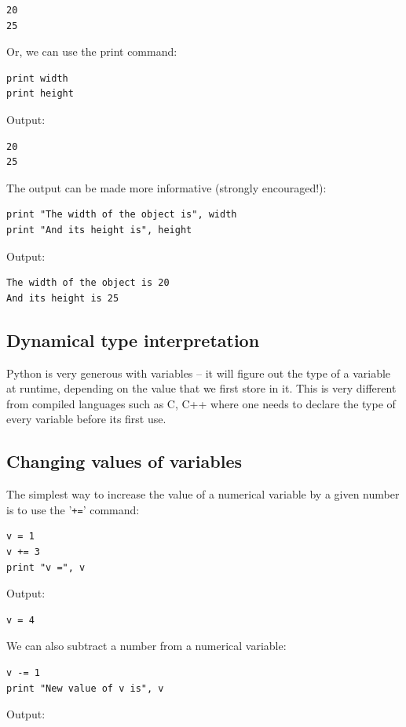 \documentclass[article,A4,12pt]{llncs}
\begin{document}
\begin{verbatim}
20
25
\end{verbatim}
Or, we can use the print command:

\begin{verbatim}
print width
print height
\end{verbatim}
Output:

\begin{verbatim}
20
25
\end{verbatim}
The output can be made more informative (strongly encouraged!):

\begin{verbatim}
print "The width of the object is", width
print "And its height is", height
\end{verbatim}
Output:

\begin{verbatim}
The width of the object is 20
And its height is 25
\end{verbatim}

\subsection{Dynamical type interpretation}

Python is very generous with variables -- it will figure out the type of a variable 
at runtime, depending on the value that we first store in it. This is very different 
from compiled languages such as C, C++ where one needs to declare the type of every variable 
before its first use. 

\subsection{Changing values of variables}

The simplest way to increase the value of a numerical variable by a given number is to use the '{\tt +=}' 
command:

\begin{verbatim}
v = 1
v += 3
print "v =", v
\end{verbatim}
Output:

\begin{verbatim}
v = 4
\end{verbatim}
We can also subtract a number from a numerical variable:

\begin{verbatim}
v -= 1
print "New value of v is", v
\end{verbatim}
Output:
\end{document}
